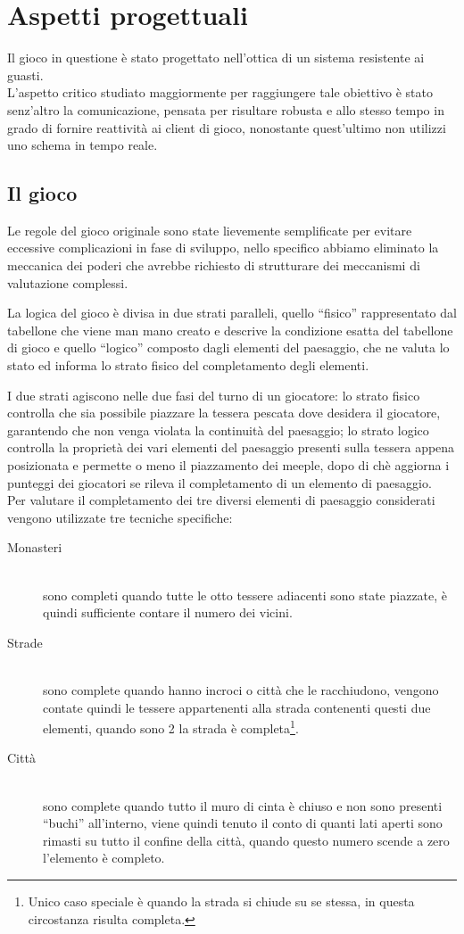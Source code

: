 \section{Aspetti progettuali}
Il gioco in questione è stato progettato nell'ottica di un sistema
resistente ai guasti.\\
L'aspetto critico studiato maggiormente per raggiungere tale
obiettivo è stato 
senz'altro la comunicazione, pensata per
risultare robusta e allo stesso tempo in grado di fornire reattività ai
client di gioco, nonostante quest'ultimo non utilizzi uno schema
in tempo reale.

\subsection{Il gioco}
Le regole del gioco originale sono state lievemente semplificate per evitare eccessive complicazioni in fase di sviluppo, nello specifico abbiamo eliminato la meccanica dei poderi che avrebbe richiesto di strutturare dei meccanismi di valutazione complessi.

La logica del gioco \`e divisa in due strati paralleli, quello ``fisico'' rappresentato dal tabellone che viene man mano creato e descrive la condizione esatta del tabellone di gioco e quello ``logico'' composto dagli elementi del paesaggio, che ne valuta lo stato ed informa lo strato fisico del completamento degli elementi.

I due strati agiscono nelle due fasi del turno di un giocatore: lo strato fisico controlla che sia possibile piazzare la tessera pescata dove desidera il giocatore, garantendo che non venga violata la continuit\`a del paesaggio; lo strato logico controlla la propriet\`a dei vari elementi del paesaggio presenti sulla tessera appena posizionata e permette o meno il piazzamento dei meeple, dopo di ch\`e aggiorna i punteggi dei giocatori se rileva il completamento di un elemento di paesaggio.\\

Per valutare il completamento dei tre diversi elementi di paesaggio considerati vengono utilizzate tre tecniche specifiche:
\begin{description}
	\item[Monasteri] \hfill \\
		sono completi quando tutte le otto tessere adiacenti sono state piazzate, \`e quindi sufficiente contare il numero dei vicini.
	\item[Strade] \hfill \\
		sono complete quando hanno incroci o citt\`a che le racchiudono, vengono contate quindi le tessere appartenenti alla strada contenenti questi due elementi, quando sono 2 la strada \`e completa\footnote{Unico caso speciale \`e quando la strada si chiude su se stessa, in questa circostanza risulta completa.}.
	\item[Città] \hfill \\
		sono complete quando tutto il muro di cinta \`e chiuso e non sono presenti ``buchi'' all'interno, viene quindi tenuto il conto di quanti lati aperti sono rimasti su tutto il confine della citt\`a, quando questo numero scende a zero l'elemento \`e completo.
\end{description}

